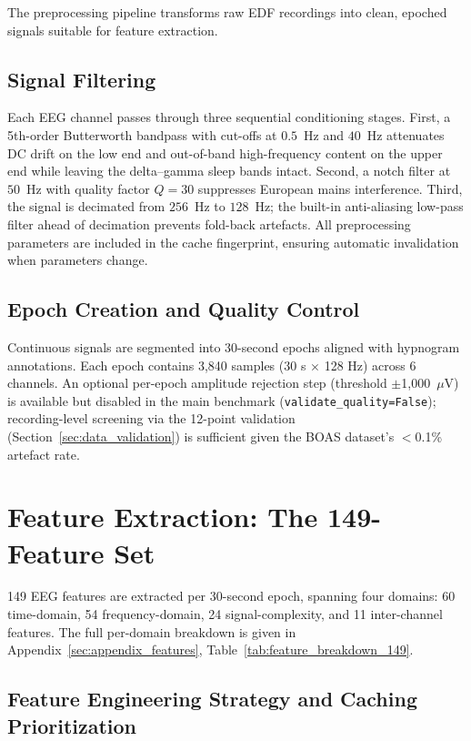 The preprocessing pipeline transforms raw EDF recordings into clean, epoched signals suitable for feature extraction.

\subsection{Signal Filtering}

Each EEG channel passes through three sequential conditioning stages.
First, a 5th-order Butterworth bandpass with cut-offs at $0.5$~Hz and
$40$~Hz attenuates DC drift on the low end and out-of-band high-frequency
content on the upper end while leaving the delta--gamma sleep bands
intact. Second, a notch filter at $50$~Hz with quality factor $Q{=}30$
suppresses European mains interference. Third, the signal is decimated
from $256$~Hz to $128$~Hz; the built-in anti-aliasing low-pass filter
ahead of decimation prevents fold-back artefacts. All preprocessing
parameters are included in the cache fingerprint, ensuring automatic
invalidation when parameters change.

\subsection{Epoch Creation and Quality Control}

Continuous signals are segmented into 30-second epochs aligned with hypnogram
annotations. Each epoch contains 3,840 samples (30 s $\times$ 128 Hz) across
6 channels. An optional per-epoch amplitude rejection step
(threshold $\pm$1{,}000~$\mu$V) is available but disabled in the main
benchmark (\texttt{validate\_quality=False}); recording-level screening
via the 12-point validation (Section~\ref{sec:data_validation}) is
sufficient given the BOAS dataset's $<$0.1\% artefact rate.

\section{Feature Extraction: The 149-Feature Set}
\label{sec:features}

149 EEG features are extracted per 30-second epoch, spanning four domains:
60 time-domain, 54 frequency-domain, 24 signal-complexity, and 11
inter-channel features. The full per-domain breakdown is given in
Appendix~\ref{sec:appendix_features},
Table~\ref{tab:feature_breakdown_149}.

\subsection{Feature Engineering Strategy and Caching Prioritization}

